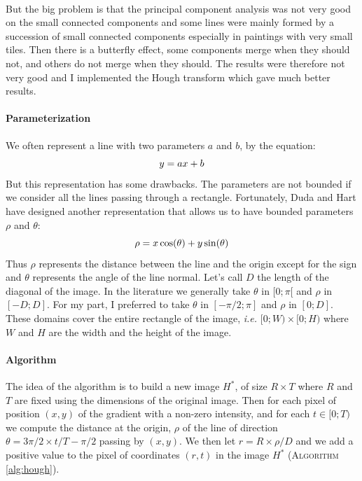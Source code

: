 \documentclass[11pt]{article}
\begin{document}
	\paragraph{}
	But the big problem is that the principal component analysis was not very good on the small connected components and some lines were mainly formed by a succession of small connected components especially in paintings with very small tiles. Then there is a butterfly effect, some components merge when they should not, and others do not merge when they should. The results were therefore not very good and I implemented the Hough transform \cite{hough} which gave much better results.
	
	\paragraph{Parameterization}
	We often represent a line with two parameters $a$ and $b$, by the equation:
	\vspace{-2.2mm} $$ y = ax + b \vspace{-2.2mm} $$ 
	But this representation has some drawbacks. The parameters are not bounded if we consider all the lines passing through a rectangle. Fortunately, Duda and Hart have designed another representation that allows us to have bounded parameters $\rho$ and $\theta$:
	\vspace{-2.2mm} $$ \rho = x \cos(\theta) + y \sin(\theta) \vspace{-2.2mm} $$
	Thus $\rho$ represents the distance between the line and the origin except for the sign and $\theta$ represents the angle of the line normal. Let's call $D$ the length of the diagonal of the image. In the literature we generally take $\theta$ in $[0; \pi[$ and $\rho$ in $[-D; D]$. For my part, I preferred to take $\theta$ in $[-\pi / 2; \pi]$ and $\rho$ in $[0; D]$. These domains cover the entire rectangle of the image, \textit{i.e.} $[0; W) \times[0; H)$ where $W$ and $H$ are the width and the height of the image.
	
	\paragraph{Algorithm}
	The idea of the algorithm is to build a new image $H^*$, of size $R \times T$ where $R$ and $T$ are fixed using the dimensions of the original image. Then for each pixel of position $(x, y)$ of the gradient with a non-zero intensity, and for each $t \in[0; T)$ we compute the distance at the origin, $\rho$ of the line of direction $\theta = 3 \pi / 2 \times t / T - \pi / 2$ passing by $ (x, y)$. We then let $r = R \times \rho / D$ and we add a positive value to the pixel of coordinates $(r, t)$ in the image $H^*$ (\textsc{Algorithm} \ref{alg:hough}).
	
\end{document}
